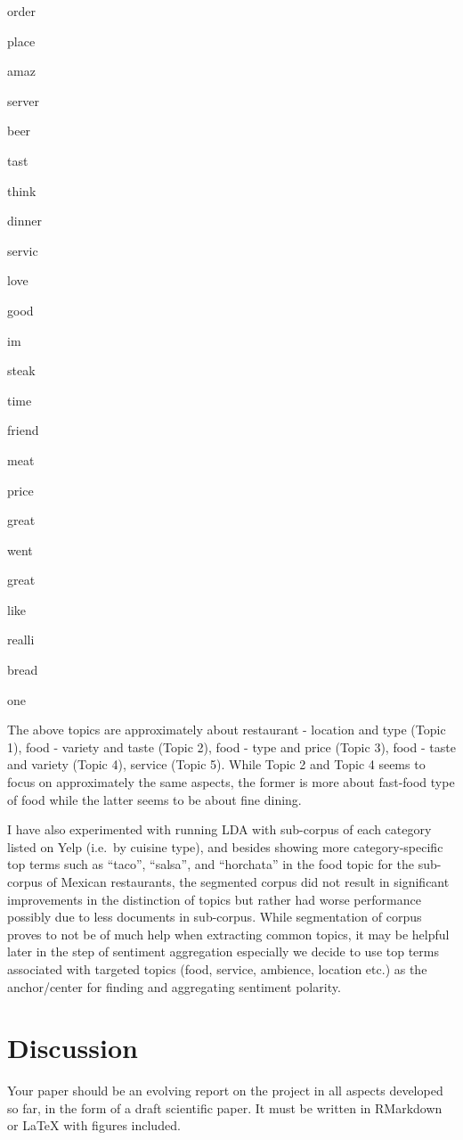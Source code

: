 \documentclass[12pt,twoside]{dukestatscithesis}
\theoremstyle{definition}
\theoremstyle{definition}
\theoremstyle{definition}
\theoremstyle{remark}
\begin{document}
order

place

amaz

server

beer

tast

think

dinner

servic

love

good

im

steak

time

friend

meat

price

great

went

great

like

realli

bread

one

The above topics are approximately about restaurant - location and type
(Topic 1), food - variety and taste (Topic 2), food - type and price
(Topic 3), food - taste and variety (Topic 4), service (Topic 5). While
Topic 2 and Topic 4 seems to focus on approximately the same aspects,
the former is more about fast-food type of food while the latter seems
to be about fine dining.

I have also experimented with running LDA with sub-corpus of each
category listed on Yelp (i.e.~by cuisine type), and besides showing more
category-specific top terms such as ``taco'', ``salsa'', and
``horchata'' in the food topic for the sub-corpus of Mexican
restaurants, the segmented corpus did not result in significant
improvements in the distinction of topics but rather had worse
performance possibly due to less documents in sub-corpus. While
segmentation of corpus proves to not be of much help when extracting
common topics, it may be helpful later in the step of sentiment
aggregation especially we decide to use top terms associated with
targeted topics (food, service, ambience, location etc.) as the
anchor/center for finding and aggregating sentiment polarity.

\chapter{Discussion}\label{discussion}

Your paper should be an evolving report on the project in all aspects
developed so far, in the form of a draft scientific paper. It must be
written in RMarkdown or LaTeX with figures included.
\end{document}
